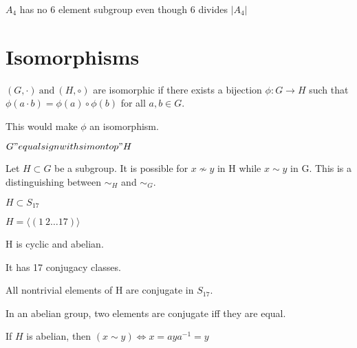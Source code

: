 \documentclass[class=scrartcl, crop=false]{standalone}
\begin{document}
\begin{note}
  $A_4$ has no 6 element subgroup even though 6 divides $|A_4|$
\end{note}

\section{Isomorphisms}

\begin{definition}
  $(G, \cdot) \ \text{and} \ (H, \circ)$ are isomorphic if there exists a bijection $\phi:G \to H$ such that $\phi(a \cdot b) = \phi(a) \circ \phi(b)$ for all $a, b \in G$.

  This would make $\phi$ an isomorphism.

  $G "equal sign with sim on top" H$
\end{definition}

\begin{note}
  Let $H \subset G$ be a subgroup. It is possible for $x \not\sim y$ in H while $x \sim y$ in G. This is a distinguishing between $\sim_H$ and $\sim_G$.


  \begin{example}
    $H \subset S_{17}$

    $H = \langle (1 \ 2 \dots 17) \rangle $

    H is cyclic and abelian.

    It has 17 conjugacy classes.

    All nontrivial elements of H are conjugate in $S_{17}$.
  \end{example}
\end{note}

\begin{note}
  In an abelian group, two elements are conjugate iff they are equal.

  If $H$ is abelian, then $(x \sim y) \Leftrightarrow x = aya^{-1} = y$
\end{note}
  
\end{document}
